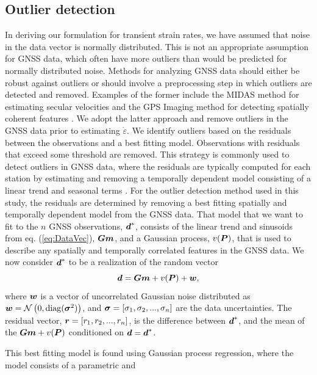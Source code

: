 \documentclass[extra,mreferee]{gji}
\begin{document}
\subsection{Outlier detection}\label{sec:Outlier}
In deriving our formulation for transient strain rates, we have assumed that noise in the data vector is normally distributed. This is not an appropriate assumption for GNSS data, which often have more outliers than would be predicted for normally distributed noise. Methods for analyzing GNSS data should either be robust against outliers or should involve a preprocessing step in which outliers are detected and removed. Examples of the former include the MIDAS method for estimating secular velocities \citep{Blewitt2016} and the GPS Imaging method for detecting spatially coherent features \citep{Hammond2016}.  We adopt the latter approach and remove outliers in the GNSS data prior to estimating $\dot\varepsilon$. We identify outliers based on the residuals between the observations and a best fitting model. Observations with residuals that exceed some threshold are removed. This strategy is commonly used to detect outliers in GNSS data, where the residuals are typically computed for each station by estimating and removing a temporally dependent model consisting of a linear trend and seasonal terms \citep[e.g.,][]{Johansson2002,Dong2006,Bos2013}. For the outlier detection method used in this study, the residuals are determined by removing a best fitting spatially and temporally dependent model from the GNSS data. That model that we want to fit to the $n$ GNSS observations, $\mitbf{d}^*$, consists of the linear trend and sinusoids from eq. (\ref{eq:DataVec}), $\mitbf{G}\mitbf{m}$, and a Gaussian process, $v(\mitbf{P})$, that is used to describe any spatially and temporally correlated features in the GNSS data. We now consider $\mitbf{d}^*$ to be a realization of the random vector
\begin{equation}
\mitbf{d} = \mitbf{G}\mitbf{m} + v(\mitbf{P}) + \mitbf{w},
\end{equation}   
where $\mitbf{w}$ is a vector of uncorrelated Gaussian noise distributed as $\mitbf{w} = \mathcal{N}\left(0,\mathrm{diag}(\mitbf{\sigma}^2)\right)$, and $\mitbf{\sigma} = [\sigma_1, \sigma_2, ..., \sigma_n]$ are the data uncertainties. The residual vector, $\mitbf{r} = [r_1,r_2,...,r_n]$, is the difference between $\mitbf{d}^*$, and the mean of the $\mitbf{G}\mitbf{m} + v(\mitbf{P})$ conditioned on $\mitbf{d} = \mitbf{d}^*$.

This best fitting model is found using Gaussian process regression, where the model consists of a parametric and 
\end{document}
